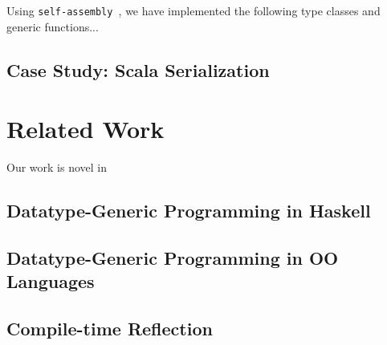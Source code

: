 \documentclass[preprint]{sigplanconf}
\newcommand{\selfassembly}{\texttt{self-assembly~}}
\begin{document}
Using \selfassembly, we have implemented the following type classes and
generic functions...

\subsection{Case Study: Scala Serialization}


\section{Related Work}
\label{sec:related-work}

Our work is novel in

\subsection{Datatype-Generic Programming in Haskell}

\subsection{Datatype-Generic Programming in OO Languages}

\subsection{Compile-time Reflection}

\cite{TemplateYourBoilerplate}
\cite{Pickling}
\cite{SYB}









% 




\end{document}
